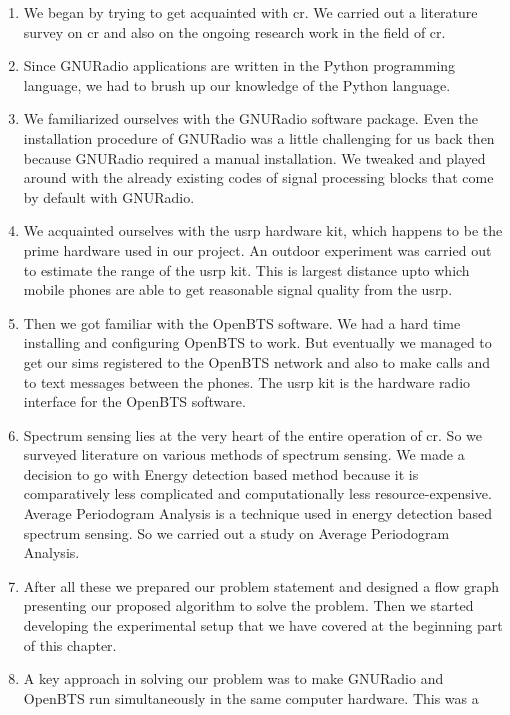 \begin{enumerate}
    \item We began by trying to get acquainted with \gls{cr}. We 
    carried out a literature survey on \gls{cr} and also on the ongoing 
    research work in the field of \gls{cr}.
    \item Since GNURadio applications are written in the Python programming 
    language, we had to brush up our knowledge of the Python language.
    \item We familiarized ourselves with the GNURadio software package. Even 
    the installation procedure of GNURadio was a little challenging for us
    back then because GNURadio required a manual installation. We tweaked
    and played around with the already existing codes of signal processing
    blocks that come by default with GNURadio.
    \item We acquainted ourselves with the \gls{usrp} hardware kit, which happens to
    be the prime hardware used in our project. An outdoor experiment was
    carried out to estimate the range of the \gls{usrp} kit. This is largest 
    distance upto which mobile phones are able to get reasonable signal
    quality from the \gls{usrp}.
    \item Then we got familiar with the OpenBTS software. We had a hard time
    installing and configuring OpenBTS to work. But eventually we managed to 
    get our \glspl{sim} registered to the OpenBTS network and also to make calls and
    to text messages between the phones. The \gls{usrp} kit is the hardware radio 
    interface for the OpenBTS software.
    \item Spectrum sensing lies at the very heart of the entire operation of 
    \gls{cr}. So we surveyed literature on various methods of spectrum
    sensing. We made a decision to go with Energy detection based method 
    because it is comparatively less complicated and computationally less 
    resource-expensive. Average Periodogram Analysis is a technique used in 
    energy detection based spectrum sensing. So we carried out a study on
    Average Periodogram Analysis.
    \item After all these we prepared our problem statement and designed a 
    flow graph presenting our proposed algorithm to solve the problem. Then 
    we started developing the experimental setup that we have covered at the
    beginning part of this chapter.
    \item A key approach in solving our problem was to make GNURadio and 
    OpenBTS run simultaneously in the same computer hardware. This was a

\end{enumerate}
